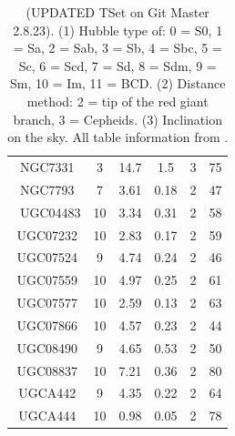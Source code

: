 \documentclass[reprint,%
 amsmath,amssymb,
 aps,
]{revtex4-1}
\begin{document}
\begin{table}[]
\begin{tabular}{|c|c|c|c|c|c|}
NGC7331& 	3& 	14.7& 	1.5&    	3& 	75\\
NGC7793& 	7& 	3.61& 	0.18&   	2& 	47\\\
UGC04483& 	10& 	3.34& 	0.31& 	2& 	58\\
UGC07232& 	10& 	2.83& 	0.17& 	2& 	59\\
UGC07524& 	9& 	4.74& 	0.24& 	    2& 	46\\
UGC07559& 	10& 	4.97& 	0.25& 	2& 	61\\
UGC07577& 	10& 	2.59& 	0.13& 	2& 	63\\
UGC07866& 	10& 	4.57& 	0.23& 	2& 	44\\
UGC08490& 	9& 	4.65& 	0.53&   	2& 	50\\
UGC08837& 	10& 	7.21& 	0.36& 	2& 	80\\
UGCA442& 	9& 	4.35& 	0.22& 	    2& 	64\\
UGCA444& 	10& 	0.98& 	0.05& 	2& 	78\\
    \hline \hline           
      \end{tabular}
      \caption{{\color{blue}(UPDATED TSet on Git Master  2.8.23)}.
      (1) Hubble type 
of: 0 = S0, 1 = Sa, 2 = Sab,
3 = Sb, 4 = Sbc, 5 = Sc, 6 = Scd, 7 = Sd, 8 = Sdm,
9 = Sm, 10 = Im, 11 = BCD. 
(2) Distance method:  
2 = tip of the red giant branch, 3 = Cepheids.  (3) Inclination on the sky. All table information from \citet{2016Lelli}. } 
\label{tab:Tset}
  \end{table}
 
 
 
\end{document}
